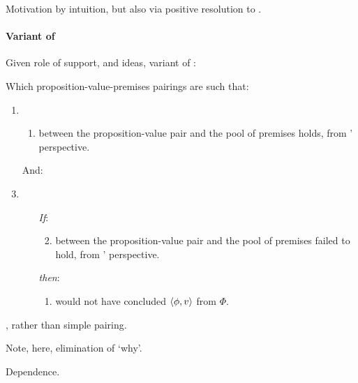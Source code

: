 \begin{note}
  Motivation by intuition, but also via positive resolution to \issueInclusion{}.
\end{note}

\paragraph{Variant of \qWhy{}}
\label{cha:clar:expand:qWhy:variant}

\begin{note}
  Given role of support, and ideas, variant of \qWhy{}:

  \begin{question}[\qWhyV{}]
    \label{q:why:v}
    Which proposition-value-premises pairings are such that:

    \begin{enumerate}[label=]
    \item
      \begin{enumerate}[label=\alph*., ref=(\alph*)]
      \item
         between the proposition-value pair and the pool of premises holds, from \vAgent{}' perspective.
      \end{enumerate}
    \item[And:]
    \item
      \begin{enumerate}
      \item[\emph{If}:]
        \begin{enumerate}[label=\alph*., ref=(\alph*), resume]
          \setcounter{enumiii}{1}
        \item
           between the proposition-value pair and the pool of premises failed to hold, from \vAgent{}' perspective.
        \end{enumerate}
      \item[\emph{then}:]
        \begin{enumerate}[label=\alph*., ref=(\alph*), resume]
        \item \vAgent{} would not have concluded \(\langle \phi, v \rangle\) from \(\Phi\).
        \end{enumerate}
      \end{enumerate}
    \end{enumerate}
\end{question}

  \support{}, rather than simple pairing.

  Note, here, elimination of `why'.

  Dependence.
\end{note}

